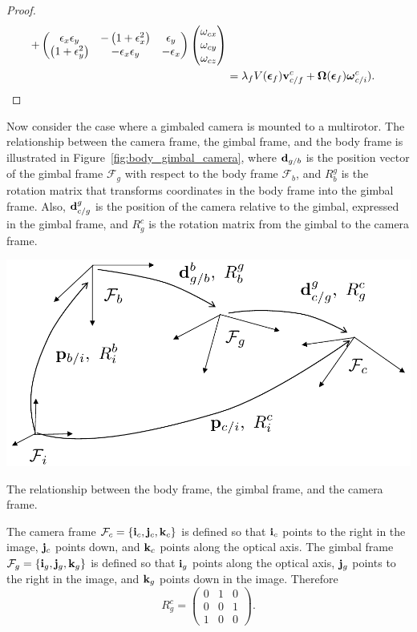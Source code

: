 \begin{proof}
\begin{align*}
	+ \begin{pmatrix}
	\epsilon_x\epsilon_y & -\left(1 + \epsilon_x^2\right) & \epsilon_y \\
	\left(1 + \epsilon_y^2\right) & -\epsilon_x\epsilon_y & -\epsilon_x
	\end{pmatrix}\begin{pmatrix} \omega_{cx} \\ \omega_{cy} \\ \omega_{cz} \end{pmatrix} \\
	&=\lambda_f V(\boldsymbol{\epsilon}_f)\mathbf{v}_{c/f}^c + \boldsymbol{\Omega}(\boldsymbol{\epsilon}_f)\boldsymbol{\omega}_{c/i}^c).	
	\end{align*}
\end{proof}
	
Now consider the case where a gimbaled camera is mounted to a multirotor.  The relationship between the camera frame, the gimbal frame, and the body frame is illustrated in Figure~\ref{fig:body_gimbal_camera}, where $\mathbf{d}_{g/b}$ is the position vector of the gimbal frame $\mathcal{F}_g$ with respect to the body frame $\mathcal{F}_b$, and $R_b^g$ is the rotation matrix that transforms coordinates in the body frame into the gimbal frame. Also, $\mathbf{d}_{c/g}^g$ is the position of the camera relative to the gimbal, expressed in the gimbal frame, and $R_g^c$ is the rotation matrix from the gimbal to the camera frame. 
\begin{marginfigure}
	\includegraphics[width=\linewidth]{chap9_visual_servoing/figures/body_gimbal_camera}
	\caption{The relationship between the body frame, the gimbal frame, and the camera frame.}
	\label{fig:body_gimbal_camera}
\end{marginfigure}
The camera frame $\mathcal{F}_c = \{\mathbf{i}_c, \mathbf{j}_c, \mathbf{k}_c\}$ is defined so that $\mathbf{i}_c$ points to the right in the image, $\mathbf{j}_c$ points down, and $\mathbf{k}_c$ points along the optical axis.  The gimbal frame $\mathcal{F}_g = \{\mathbf{i}_g, \mathbf{j}_g, \mathbf{k}_g\}$ is defined so that $\mathbf{i}_g$ points along the optical axis, $\mathbf{j}_g$ points to the right in the image, and $\mathbf{k}_g$ points down in the image.  Therefore
\[
R_g^c = \begin{pmatrix}0 & 1 & 0 \\ 0 & 0 & 1 \\ 1 & 0 & 0 \end{pmatrix}.
\]

